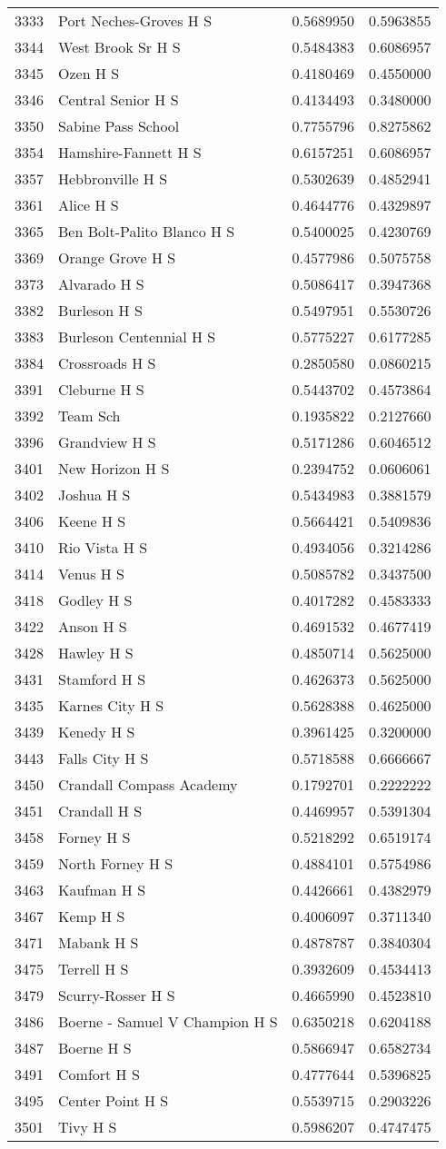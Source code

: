 \documentclass[
]{article}
\begin{document}
\begin{longtable}[]{@{}llrr@{}}
3333 & Port Neches-Groves H S & 0.5689950 & 0.5963855\tabularnewline
3344 & West Brook Sr H S & 0.5484383 & 0.6086957\tabularnewline
3345 & Ozen H S & 0.4180469 & 0.4550000\tabularnewline
3346 & Central Senior H S & 0.4134493 & 0.3480000\tabularnewline
3350 & Sabine Pass School & 0.7755796 & 0.8275862\tabularnewline
3354 & Hamshire-Fannett H S & 0.6157251 & 0.6086957\tabularnewline
3357 & Hebbronville H S & 0.5302639 & 0.4852941\tabularnewline
3361 & Alice H S & 0.4644776 & 0.4329897\tabularnewline
3365 & Ben Bolt-Palito Blanco H S & 0.5400025 & 0.4230769\tabularnewline
3369 & Orange Grove H S & 0.4577986 & 0.5075758\tabularnewline
3373 & Alvarado H S & 0.5086417 & 0.3947368\tabularnewline
3382 & Burleson H S & 0.5497951 & 0.5530726\tabularnewline
3383 & Burleson Centennial H S & 0.5775227 & 0.6177285\tabularnewline
3384 & Crossroads H S & 0.2850580 & 0.0860215\tabularnewline
3391 & Cleburne H S & 0.5443702 & 0.4573864\tabularnewline
3392 & Team Sch & 0.1935822 & 0.2127660\tabularnewline
3396 & Grandview H S & 0.5171286 & 0.6046512\tabularnewline
3401 & New Horizon H S & 0.2394752 & 0.0606061\tabularnewline
3402 & Joshua H S & 0.5434983 & 0.3881579\tabularnewline
3406 & Keene H S & 0.5664421 & 0.5409836\tabularnewline
3410 & Rio Vista H S & 0.4934056 & 0.3214286\tabularnewline
3414 & Venus H S & 0.5085782 & 0.3437500\tabularnewline
3418 & Godley H S & 0.4017282 & 0.4583333\tabularnewline
3422 & Anson H S & 0.4691532 & 0.4677419\tabularnewline
3428 & Hawley H S & 0.4850714 & 0.5625000\tabularnewline
3431 & Stamford H S & 0.4626373 & 0.5625000\tabularnewline
3435 & Karnes City H S & 0.5628388 & 0.4625000\tabularnewline
3439 & Kenedy H S & 0.3961425 & 0.3200000\tabularnewline
3443 & Falls City H S & 0.5718588 & 0.6666667\tabularnewline
3450 & Crandall Compass Academy & 0.1792701 & 0.2222222\tabularnewline
3451 & Crandall H S & 0.4469957 & 0.5391304\tabularnewline
3458 & Forney H S & 0.5218292 & 0.6519174\tabularnewline
3459 & North Forney H S & 0.4884101 & 0.5754986\tabularnewline
3463 & Kaufman H S & 0.4426661 & 0.4382979\tabularnewline
3467 & Kemp H S & 0.4006097 & 0.3711340\tabularnewline
3471 & Mabank H S & 0.4878787 & 0.3840304\tabularnewline
3475 & Terrell H S & 0.3932609 & 0.4534413\tabularnewline
3479 & Scurry-Rosser H S & 0.4665990 & 0.4523810\tabularnewline
3486 & Boerne - Samuel V Champion H S & 0.6350218 &
0.6204188\tabularnewline
3487 & Boerne H S & 0.5866947 & 0.6582734\tabularnewline
3491 & Comfort H S & 0.4777644 & 0.5396825\tabularnewline
3495 & Center Point H S & 0.5539715 & 0.2903226\tabularnewline
3501 & Tivy H S & 0.5986207 & 0.4747475\tabularnewline

\end{longtable}
\end{document}
